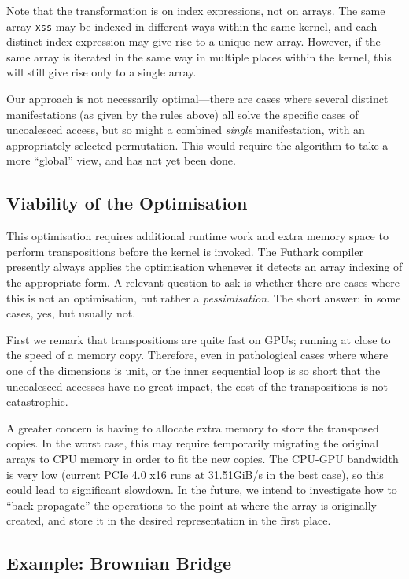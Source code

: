Note that the transformation is on index expressions, not on arrays.
The same array \lstinline{xss} may be indexed in different ways within
the same kernel, and each distinct index expression may give rise to a
unique new  array.  However, if the same array is
iterated in the same way in multiple places within the kernel, this
will still give rise only to a single array.

Our approach is not necessarily optimal---there are cases where
several distinct manifestations (as given by the rules above) all
solve the specific cases of uncoalesced access, but so might a
combined \textit{single} manifestation, with an appropriately selected
permutation.  This would require the algorithm to take a more
``global'' view, and has not yet been done.

\subsection{Viability of the Optimisation}

This optimisation requires additional runtime work and extra memory
space to perform transpositions before the kernel is invoked.  The
Futhark compiler presently always applies the optimisation whenever it
detects an array indexing of the appropriate form.  A relevant
question to ask is whether there are cases where this is not an
optimisation, but rather a \textit{pessimisation}.  The short answer:
in some cases, yes, but usually not.

First we remark that transpositions are quite fast on GPUs; running at
close to the speed of a memory copy.  Therefore, even in pathological
cases where where one of the dimensions is unit, or the inner
sequential loop is so short that the uncoalesced accesses have no
great impact, the cost of the transpositions is not catastrophic.

A greater concern is having to allocate extra memory to store the
transposed copies.  In the worst case, this may require temporarily
migrating the original arrays to CPU memory in order to fit the new
copies.  The CPU-GPU bandwidth is very low (current PCIe 4.0 x16 runs
at 31.51GiB/s in the best case), so this could lead to significant
slowdown.  In the future, we intend to investigate how to
``back-propagate'' the  operations to the point at where
the array is originally created, and store it in the desired
representation in the first place.

\subsection{Example: Brownian Bridge}

